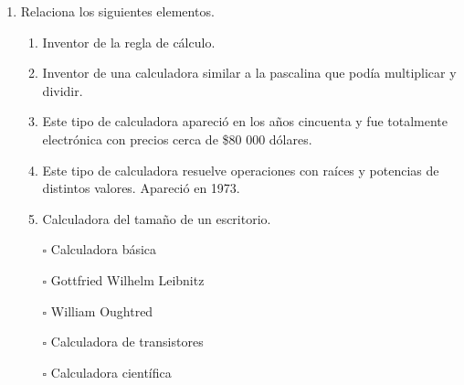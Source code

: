 \documentclass[11pt]{book}
\begin{document}
\begin{enumerate}
\begin{enumerate}
          \end{enumerate}

    \item Relaciona los siguientes elementos.

          \begin{minipage}{0.45\linewidth}
              \begin{enumerate}
                  \item Inventor de la regla de c\'alculo.
                  \item Inventor de una calculadora similar a la pascalina que pod\'ia
                        multiplicar y dividir.
                  \item Este tipo de calculadora apareci\'o en los años cincuenta y fue
                        totalmente electr\'onica con precios cerca de \$80 000 d\'olares.
                  \item Este tipo de calculadora resuelve operaciones con ra\'ices y
                        potencias de distintos valores. Apareci\'o en 1973.
                  \item Calculadora del tamaño de un escritorio.
              \end{enumerate}
          \end{minipage}\hfill
          \begin{minipage}{0.4\linewidth}
              \begin{itemize}
                  \item[\Huge$\square$] Calculadora b\'asica \vspace{0.5cm}
                  \item[\Huge$\square$] Gottfried Wilhelm Leibnitz  \vspace{0.5cm}
                  \item[\Huge$\square$] William Oughtred	  \vspace{0.5cm}
                  \item[\Huge$\square$] Calculadora de transistores    \vspace{0.5cm}
                  \item[\Huge$\square$] Calculadora cient\'ifica   \vspace{0.5cm}
              \end{itemize}


\end{minipage}
\end{enumerate}
\end{document}
